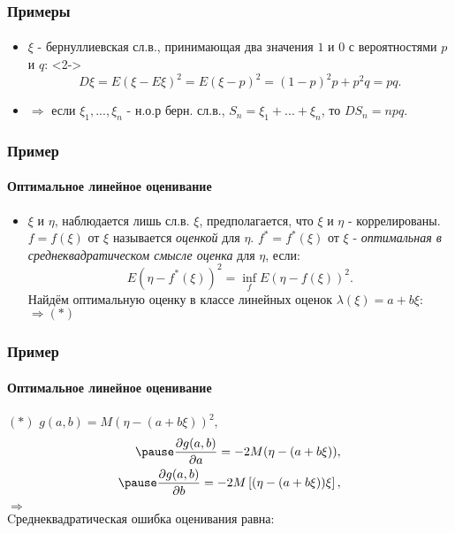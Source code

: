 \begin{frame}
\frametitle{Примеры}
\framesubtitle{}

\begin{itemize}
	\item	<1-> $\xi$ - бернуллиевская сл.в., принимающая два значения $1$ и $0$ с вероятностями $p$ и $q$:
	<2->
	\begin{equation*}
	   D\xi= E(\xi - E\xi)^2=E(\xi - p)^2=(1-p)^2p+p^2q=pq.
	\end{equation*}
	\item   <3-> $\Rightarrow$ если $\xi_1, ..., \xi_n$ - н.о.р берн. сл.в., $S_n=\xi_1 +...+\xi_n$, то 
$DS_n=npq$.
\end{itemize}

\end{frame}

\begin{frame}
\frametitle{Пример}
\framesubtitle{Оптимальное линейное оценивание}

\begin{itemize}
	\item $\xi$ и $\eta$, наблюдается лишь сл.в. $\xi$, предполагается, что $\xi$ и $\eta$ - коррелированы. \pause $f=f(\xi)$ от $\xi$ называется \textit{оценкой} для $\eta$. \pause $f^*=f^*(\xi)$ от $\xi$  -  \textit{оптимальная в среднеквадратическом смысле оценка} для $\eta$, если:
		\begin{equation*}
	   E(\eta - f^*(\xi))^2= \inf_f E(\eta - f(\xi))^2.
	\end{equation*}
	\pause
	Найдём оптимальную оценку в классе линейных оценок
$\lambda(\xi) = a + b \xi$: $\Rightarrow (*)$
\end{itemize}

\end{frame}


\begin{frame}
\frametitle{Пример}
\framesubtitle{Оптимальное линейное оценивание}
$(*)$
\pause $g(a,b)=M(\eta - (a + b\xi))^2,$
\begin{eqnarray*}
\pause \frac{\partial g(a,b)}{\partial a}=-2M(\eta - (a + b\xi)),
\\
\pause \frac{\partial g(a,b)}{\partial b}=-2M \left[ (\eta - (a + b\xi))\xi \right],
\end{eqnarray*}
$\Rightarrow$ \pause
\pause
\\
Cреднеквадратическая ошибка оценивания равна:
\end{frame}
